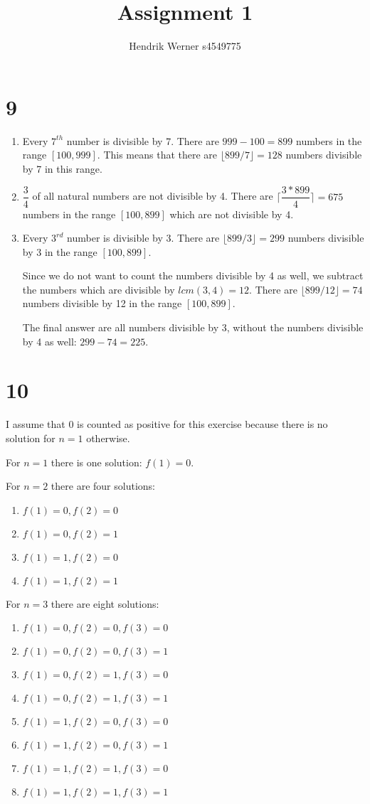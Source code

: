 \documentclass[12pt]{article}
\title{Assignment 1}
\author{
	Hendrik Werner s4549775
}
\begin{document}
\maketitle

\section*{9}
\begin{enumerate}[a]
	\item %
	Every $7^{th}$ number is divisible by 7. There are $999 - 100 = 899$ numbers in the range $[100, 999]$. This means that there are $\lfloor 899 / 7 \rfloor = 128$ numbers divisible by 7 in this range.
	\setcounter{enumi}{3} \item %
	$\dfrac{3}{4}$ of all natural numbers are not divisible by 4. There are $\lceil \dfrac{3 * 899}{4} \rceil = 675$ numbers in the range $[100, 899]$ which are not divisible by 4.
	\setcounter{enumi}{6} \item %
	Every $3^{rd}$ number is divisible by 3. There are $\lfloor 899 / 3 \rfloor = 299$ numbers divisible by 3 in the range $[100, 899]$.

	Since we do not want to count the numbers divisible by 4 as well, we subtract the numbers which are divisible by $lcm(3, 4) = 12$. There are $\lfloor 899 / 12 \rfloor = 74$ numbers divisible by 12 in the range $[100, 899]$.

	The final answer are all numbers divisible by 3, without the numbers divisible by 4 as well: $299 - 74 = 225$.
\end{enumerate}

\section*{10}
I assume that 0 is counted as positive for this exercise because there is no solution for $n = 1$ otherwise.

For $n = 1$ there is one solution: $f(1) = 0$.

For $n = 2$ there are four solutions:
\begin{enumerate}
	\item $f(1) = 0, f(2) = 0$
	\item $f(1) = 0, f(2) = 1$
	\item $f(1) = 1, f(2) = 0$
	\item $f(1) = 1, f(2) = 1$
\end{enumerate}

For $n = 3$ there are eight solutions:
\begin{enumerate}
	\item $f(1) = 0, f(2) = 0, f(3) = 0$
	\item $f(1) = 0, f(2) = 0, f(3) = 1$
	\item $f(1) = 0, f(2) = 1, f(3) = 0$
	\item $f(1) = 0, f(2) = 1, f(3) = 1$
	\item $f(1) = 1, f(2) = 0, f(3) = 0$
	\item $f(1) = 1, f(2) = 0, f(3) = 1$
	\item $f(1) = 1, f(2) = 1, f(3) = 0$
	\item $f(1) = 1, f(2) = 1, f(3) = 1$
\end{enumerate}
\end{document}
